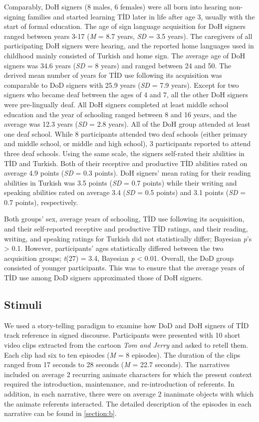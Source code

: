 \documentclass[]{elsarticle} %
\begin{document}
Comparably, DoH signers (8 males, 6 females) were all born into hearing
non-signing families and started learning TİD later in life after age 3,
usually with the start of formal education. The age of sign language
acquisition for DoH signers ranged between years 3-17 (\emph{M} = 8.7
years, \emph{SD} = 3.5 years). The caregivers of all participating DoH
signers were hearing, and the reported home languages used in childhood
mainly consisted of Turkish and home sign. The average age of DoH
signers was 34.6 years (\emph{SD} = 8 years) and ranged between 24 and
50. The derived mean number of years for TİD use following its
acquisition was comparable to DoD signers with 25.9 years (\emph{SD} =
7.9 years). Except for two signers who became deaf between the ages of 4
and 7, all the other DoH signers were pre-lingually deaf. All DoH
signers completed at least middle school education and the year of
schooling ranged between 8 and 16 years, and the average was 12.3 years
(\emph{SD} = 2.8 years). All of the DoH group attended at least one deaf
school. While 8 participants attended two deaf schools (either primary
and middle school, or middle and high school), 3 participants reported
to attend three deaf schools. Using the same scale, the signers
self-rated their abilities in TİD and Turkish. Both of their receptive
and productive TİD abilities rated on average 4.9 points (\emph{SD} =
0.3 points). DoH signers' mean rating for their reading abilities in
Turkish was 3.5 points (\emph{SD} = 0.7 points) while their writing and
speaking abilities rated on average 3.4 (\emph{SD} = 0.5 points) and 3.1
points (\emph{SD} = 0.7 points), respectively.

Both groups' sex, average years of schooling, TİD use following its
acquisition, and their self-reported receptive and productive TİD
ratings, and their reading, writing, and speaking ratings for Turkish
did not statistically differ; Bayesian \emph{p}'s \textgreater{} 0.1.
However, participants' ages statistically differed between the two
acquisition groups; \emph{t}(27) = 3.4, Bayesian \emph{p} \textless{}
0.01. Overall, the DoD group consisted of younger participants. This was
to ensure that the average years of TİD use among DoD signers
approximated those of DoH signers.

\hypertarget{stimuli}{%
\subsection{Stimuli}\label{stimuli}}

We used a story-telling paradigm to examine how DoD and DoH signers of
TİD track reference in signed discourse. Participants were presented
with 10 short video clips extracted from the cartoon \emph{Tom and
Jerry} and asked to retell them. Each clip had six to ten episodes
(\emph{M} = 8 episodes). The duration of the clips ranged from 17
seconds to 28 seconds (\emph{M} = 22.7 seconds). The narratives included
on average 2 recurring animate characters for which the present context
required the introduction, maintenance, and re-introduction of
referents. In addition, in each narrative, there were on average 2
inanimate objects with which the animate referents interacted. The
detailed description of the episodes in each narrative can be found in
\ref{section:b}.
\end{document}
